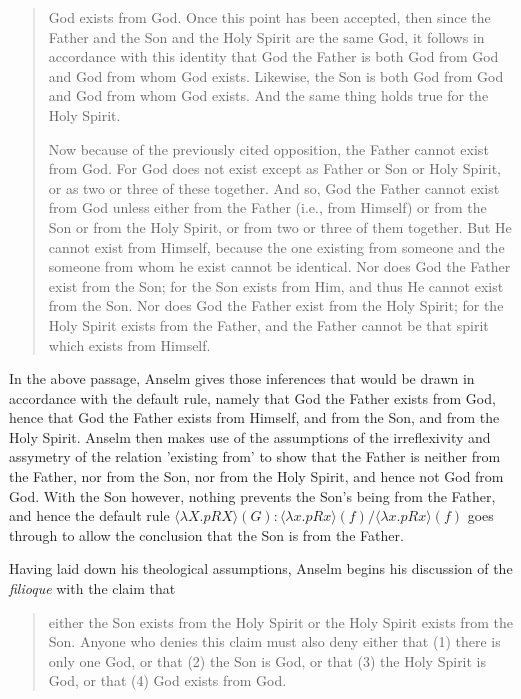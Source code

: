 \documentclass[]{article}
\begin{document}
\begin{quote}
God exists from God. Once this point has been accepted, then since the Father and the Son and the Holy Spirit are the same God, it follows in accordance with this identity that God the Father is both God from God and God from whom God exists. Likewise, the Son is both God from God and God from whom God exists. And the same thing holds true for the Holy Spirit. 

Now because of the previously cited opposition, the Father cannot exist from God. For God does not exist except as Father or Son or Holy Spirit, or as two or three of these together. And so, God the Father cannot exist from God unless either from the Father (i.e., from Himself) or from the Son or from the Holy Spirit, or from two or three of them together. But He cannot exist from Himself, because the one existing from someone and the someone from whom he exist cannot be identical. Nor does God the Father exist from the Son; for the Son exists from Him, and thus He cannot exist from the Son. Nor does God the Father exist from the Holy Spirit; for the Holy Spirit exists from the Father, and the Father cannot be that spirit which exists from Himself.\autocite[471-472]{AnselmDeProc}
\end{quote}

In the above passage, Anselm gives those inferences that would be drawn in accordance with the default rule, namely that God the Father exists from God, hence that God the Father exists from Himself, and from the Son, and from the Holy Spirit. Anselm then makes use of the assumptions of the irreflexivity and assymetry of the relation 'existing from' to show that the Father is neither from the Father, nor from the Son, nor from the Holy Spirit, and hence not God from God. With the Son however, nothing prevents the Son's being from the Father, and hence the default rule $\langle \lambda X.pRX \rangle(G): \langle \lambda x.pRx \rangle(f) / \langle \lambda x.pRx \rangle(f) $ goes through to allow the conclusion that the Son is from the Father.

Having laid down his theological assumptions, Anselm begins his discussion of the \textit{filioque} with the claim that 
\begin{quote}
	either the Son exists from the Holy Spirit or the Holy Spirit exists from the Son. Anyone who denies this claim must also deny either that (1) there is only one God, or that (2) the Son is God, or that (3) the Holy Spirit is God, or that (4) God exists from God.\autocite[473]{AnselmDeProc}
\end{quote}
\end{document}
